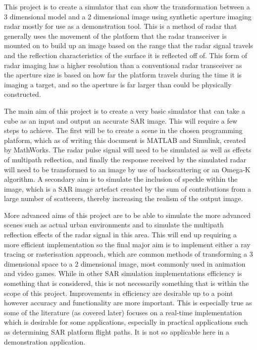 This project is to create a simulator that can show the transformation between a 3 dimensional model and a 2 dimensional image using synthetic aperture imaging radar mostly for use as a demonstration tool. This is a method of radar that generally uses the movement of the platform that the radar transceiver is mounted on to build up an image based on the range that the radar signal travels and the reflection characteristics of the surface it is reflected off of. This form of radar imaging has a higher resolution than a conventional radar transceiver as the aperture size is based on how far the platform travels during the time it is imaging a target, and so the aperture is far larger than could be physically constructed. 
\par
The main aim of this project is to create a very basic simulator that can take a cube as an input and output an accurate SAR image. This will require a few steps to achieve. The first will be to create a scene in the chosen programming platform, which as of writing this document is MATLAB and Simulink, created by MathWorks. The radar pulse signal will need to be simulated as well as effects of multipath reflection, and finally the response received by the simulated radar will need to be transformed to an image by use of backscattering or an Omega-K algorithm. A secondary aim is to simulate the inclusion of speckle within the image, which is a SAR image artefact created by the sum of contributions from a large number of scatterers, thereby increasing the realism of the output image.
\par 
More advanced aims of this project are to be able to simulate the more advanced scenes such as actual urban environments and to simulate the multipath reflection effects of the radar signal in this area. This will end up requiring a more efficient implementation so the final major aim is to implement either a ray tracing or rasterisation approach, which are common methods of transforming a 3 dimensional space to a 2 dimensional image, most commonly used in animation and video games. While in other SAR simulation implementations efficiency is something that is considered, this is not necessarily something that is within the scope of this project. Improvements in efficiency are desirable up to a point however accuracy and functionality are more important. This is especially true as some of the literature (as covered later) focuses on a real-time implementation which is desirable for some applications, especially in practical applications such as determining SAR platform flight paths. It is not so applicable here in a demonstration application.